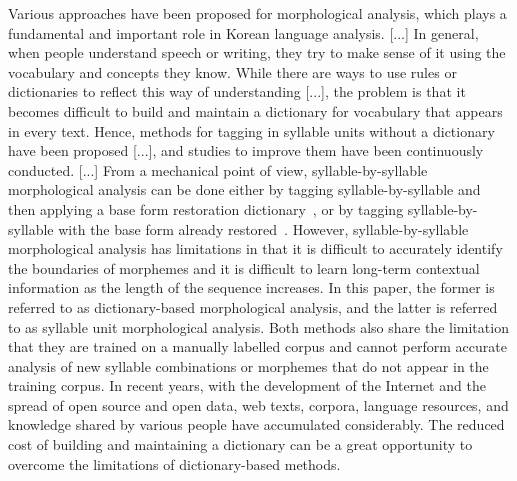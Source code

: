 \documentclass[AMS,STIX2COL]{WileyNJD-v2}
\begin{document}

    Various approaches have been proposed for morphological analysis, which plays a fundamental and important role in Korean language analysis. [...]
    In general, when people understand speech or writing, they try to make sense of it using the vocabulary and concepts they know.
    While there are ways to use rules or dictionaries to reflect this way of understanding [...], the problem is that it becomes difficult to build and maintain a dictionary for vocabulary that appears in every text.
    Hence, methods for tagging in syllable units without a dictionary have been proposed [...], and studies to improve them have been continuously conducted. [...]
    From a mechanical point of view, syllable-by-syllable morphological analysis can be done either by tagging syllable-by-syllable and then applying a base form restoration dictionary~\cite{Lee2016}, or by tagging syllable-by-syllable with the base form already restored~\cite{Youn2021}.
    However, syllable-by-syllable morphological analysis has limitations in that it is difficult to accurately identify the boundaries of morphemes and it is difficult to learn long-term contextual information as the length of the sequence increases.
    In this paper, the former is referred to as dictionary-based morphological analysis, and the latter is referred to as syllable unit morphological analysis.
    Both methods also share the limitation that they are trained on a manually labelled corpus and cannot perform accurate analysis of new syllable combinations or morphemes that do not appear in the training corpus.
    In recent years, with the development of the Internet and the spread of open source and open data, web texts, corpora, language resources, and knowledge shared by various people have accumulated considerably.
    The reduced cost of building and maintaining a dictionary can be a great opportunity to overcome the limitations of dictionary-based methods.
\end{document}
